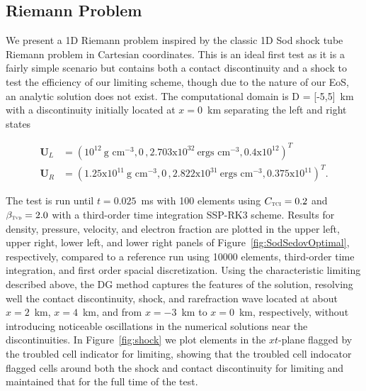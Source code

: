 \documentclass[onecolumn]{aastex62}
\newcommand{\TVD}{\textnormal{\tiny\textsc{Tvd}}}
\newcommand{\TCI}{\textnormal{\tiny\textsc{TCI}}}
\begin{document}
\subsection{Riemann Problem}
\label{sec:results:1}
We present a 1D Riemann problem inspired by the classic 1D Sod shock tube Riemann problem \citep{sod:1978} in
Cartesian coordinates. This is an ideal first test as it is a fairly simple
scenario but contains both a contact discontinuity and a shock to test the
efficiency of our limiting scheme, though due to the nature of our EoS, an analytic
solution does not exist. The computational domain is D = [-5,5]~km
with a discontinuity initially located at $x = 0$~km separating the left and right states

\begin{align*}
  \mathbf{U}_{L} &= (10^{12}~\text{g~cm}^{-3}, 0\,, 2.703\text{x}10^{32}~\text{ergs~cm}^{-3}, 0.4\text{x}10^{12})^T\,\,\, \\
  \mathbf{U}_{R} &= (1.25\text{x}10^{11}~\text{g~cm}^{-3}, 0\, , 2.822\text{x}10^{31}~\text{ergs~cm}^{-3}, 0.375\text{x}10^{11})^T.
\end{align*}

\noindent The test is run until $t = 0.025$~ms with 100 elements
using $C_{\TCI} = 0.2$ and $\beta_{\TVD} = 2.0$ with a third-order time
integration SSP-RK3 scheme. Results for density, pressure, velocity, and electron fraction
are plotted in the upper left, upper right, lower left, and lower right panels of
Figure~\ref{fig:SodSedovOptimal}, respectively, compared to a reference run using
10000 elements, third-order time integration, and first order spacial discretization.
Using the characteristic limiting described
above, the DG method captures the features of the solution,
resolving well the contact discontinuity, shock, and rarefraction wave
located at about $x=2$~km, $x=4$~km, and from $x=-3$~km to $x=0$~km, respectively, without introducing
noticeable oscillations in the numerical solutions near the discontinuities.
In Figure~\ref{fig:shock}
we plot elements in the $xt$-plane flagged by the troubled cell indicator for
limiting, showing that the troubled cell indocator flagged cells around both
the shock and contact discontinuity for limiting and maintained that
for the full time of the test.
\end{document}
